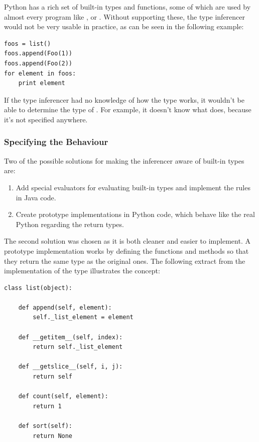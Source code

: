 \documentclass[12pt,halfparskip,DIV11,BCOR10mm]{scrreprt}
\begin{document}
Python has a rich set of built-in types and functions, some of which are used by almost every program like ,  or . Without supporting these, the type inferencer would not be very usable in practice, as can be seen in the following example:

\begin{lstlisting}
foos = list()
foos.append(Foo(1))
foos.append(Foo(2))
for element in foos:
    print element
\end{lstlisting}

If the type inferencer had no knowledge of how the  type works, it wouldn't be able to determine the type of . For example, it doesn't know what  does, because it's not specified anywhere.

\subsubsection{Specifying the Behaviour}

Two of the possible solutions for making the inferencer aware of built-in types are:

\begin{enumerate}
	\item Add special evaluators for evaluating built-in types and implement the rules in Java code.
	\item Create prototype implementations in Python code, which behave like the real Python regarding the return types.
\end{enumerate}

The second solution was chosen as it is both cleaner and easier to implement. A prototype implementation works by defining the functions and methods so that they return the same type as the original ones. The following extract from the implementation of the  type illustrates the concept:

\begin{lstlisting}
class list(object):

    def append(self, element):
        self._list_element = element

    def __getitem__(self, index):
        return self._list_element

    def __getslice__(self, i, j):
        return self

    def count(self, element):
        return 1

    def sort(self):
        return None
\end{lstlisting}
\end{document}
